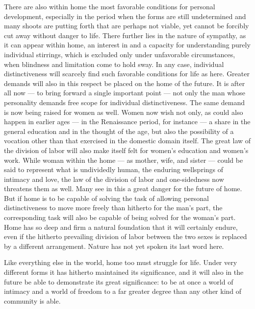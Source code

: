 \documentclass[12pt,a4paper]{article}
\newcommand{\opage}[1]{\marginnote{\footnotesize\textit{[#1]}}}
\begin{document}
There are also within home the most favorable conditions for personal
development, especially in the period when the forms are still
undetermined and many shoots are putting forth that are perhaps not
\opage{12}viable, yet cannot be forcibly cut away without danger to life. There
further lies in the nature of sympathy, as it can appear within home,
an interest in and a capacity for understanding purely individual
stirrings, which is excluded only under unfavorable circumstances,
when blindness and limitation come to hold sway. In any case,
individual distinctiveness will scarcely find such favorable conditions
for life as here. Greater demands will also in this respect be placed
on the home of the future. It is after all now --- to bring forward a
single important point --- not only the man whose personality demands
free scope for individual distinctiveness. The same demand is now
being raised for women as well. Women now wish not only, as could
also happen in earlier ages --- in the Renaissance period, for
instance --- a share in the general education and in the thought of
the age, but also the possibility of a vocation other than that
exercised in the domestic domain itself. The great law of the division
of labor will also make itself felt for women's education and women's
work. While woman within the home --- as mother, wife, and sister ---
could be said to represent what is undividedly human, the enduring
wellsprings of intimacy and love, the law of the division of labor
and one-sidedness now threatens them as well. Many see in this a
great danger for the future of home. But if home is to be capable of
solving the task of allowing personal distinctiveness to move more
freely than hitherto for the man's part, the corresponding task will
also be capable of being solved for the woman's part. Home has so
deep and firm a natural foundation that it will certainly endure, even
if the hitherto prevailing division of labor between the two sexes is
replaced by a different arrangement. Nature has not yet spoken its
last word here.

Like everything else in the world, home too must struggle for life.
Under very different forms it has hitherto maintained its significance,
and it will also in the future be able to demonstrate its great
significance: to be at once a world of intimacy and a world of freedom
to a far greater degree than any other kind of community is able.
\end{document}
